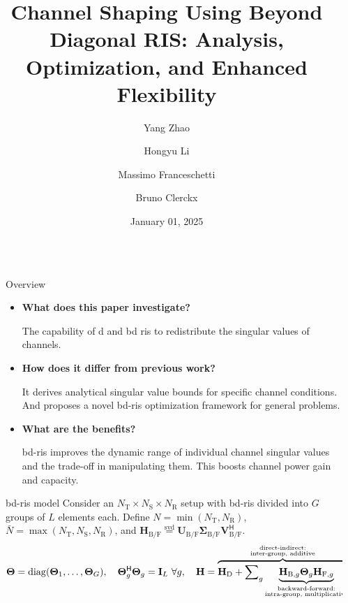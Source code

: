 \documentclass[final,xcolor={table}]{beamer}
\title{Channel Shaping Using Beyond Diagonal RIS: Analysis, Optimization, and Enhanced Flexibility}
\author{Yang Zhao \and Hongyu Li \and Massimo Franceschetti \and Bruno Clerckx}
\date{January 01, 2025}
\DeclareMathOperator{\diag}{diag}
\DeclareMathOperator{\svd}{svd}
\newlength{\sepwidth}
\newlength{\colwidth}
\newcommand{\separatorcolumn}{\begin{column}{\sepwidth}\end{column}}
\begin{document}
\begin{frame}[t]
	\begin{columns}[t]
		\separatorcolumn

		\begin{column}{\colwidth}
			\begin{block}{Overview}
				\begin{itemize}\setlength\itemsep{20pt}
					\item \textbf{What does this paper investigate?}

					The capability of \gls{d} and \gls{bd} \gls{ris} to redistribute the singular values of \glsfmtshort{mimo} channels.
					\item \textbf{How does it differ from previous work?}

					It derives analytical singular value bounds for specific channel conditions. And proposes a novel \gls{bd}-\gls{ris} optimization framework for general problems.
					\item \textbf{What are the benefits?}

					\gls{bd}-\gls{ris} improves the dynamic range of individual channel singular values and the trade-off in manipulating them. This boosts channel power gain and capacity.
				\end{itemize}
			\end{block}

			\begin{block}{\gls{bd}-\gls{ris} model}
				\setlength{\leftskip}{\leftmargini}
				\setlength{\rightskip}{\leftmargini}
				Consider an $N_\mathrm{T} \times N_\mathrm{S} \times N_\mathrm{R}$ setup with \gls{bd}-\gls{ris} divided into $G$ groups of $L$ elements each.
				Define $N = \min(N_\mathrm{T}, N_\mathrm{R})$, $\bar{N} = \max(N_\mathrm{T}, N_\mathrm{S}, N_\mathrm{R})$, and $\mathbf{H}_{\mathrm{B}/\mathrm{F}}\stackrel{\svd}{=} \mathbf{U}_{\mathrm{B}/\mathrm{F}} \boldsymbol{\Sigma}_{\mathrm{B}/\mathrm{F}} \mathbf{V}_{\mathrm{B}/\mathrm{F}}^\mathsf{H}$.
				\begin{equation*}
					\mathbf{\Theta} = \diag(\mathbf{\Theta}_1,\ldots,\mathbf{\Theta}_G),\quad \mathbf{\Theta}_g^\mathsf{H} \mathbf{\Theta}_g = \mathbf{I}_L \ \forall g, \quad \mathbf{H} = \overbrace{\mathbf{H}_\mathrm{D} + \sum\nolimits_g \underbrace{\mathbf{H}_{\mathrm{B},g} \mathbf{\Theta}_g \mathbf{H}_{\mathrm{F},g}}_{\small{\substack{\text{backward-forward:}\\\text{intra-group, multiplicative}}}}}^{\small{\substack{\text{direct-indirect:}\\\text{inter-group, additive}}}}.
				\end{equation*}


\end{block}
\end{column}
\end{columns}
\end{frame}
\end{document}

